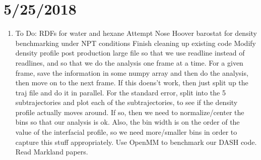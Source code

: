 \documentclass[12pt,reqno]{amsart}
\numberwithin{equation}{section}
\begin{document}
\section{5/25/2018}
\begin{enumerate}
\item To Do:
\subitem RDFs for water and hexane
\subitem Attempt Nose Hoover barostat for density benchmarking under NPT conditions 
\subitem Finish cleaning up existing code
\subitem Modify density profile post production large file so that we use readline instead of readlines, and so that we do the analysis one frame at a time.  For a given frame, save the information in some numpy array and then do the analysis, then move on to the next frame.  If this doens't work, then just split up the traj file and do it in parallel.  
\subitem For the standard error, split into the 5 subtrajectories and plot each of the subtrajectories, to see if the density profile actually moves around.  If so, then we need to normalize/center the bins so that our analysis is ok.  Also, the bin width is on the order of the value of the interfacial profile, so we need more/smaller bins in order to capture this stuff appropriately.  
\subitem Use OpenMM to benchmark our DASH code.  Read Markland papers.
\end{enumerate}
\end{document}
